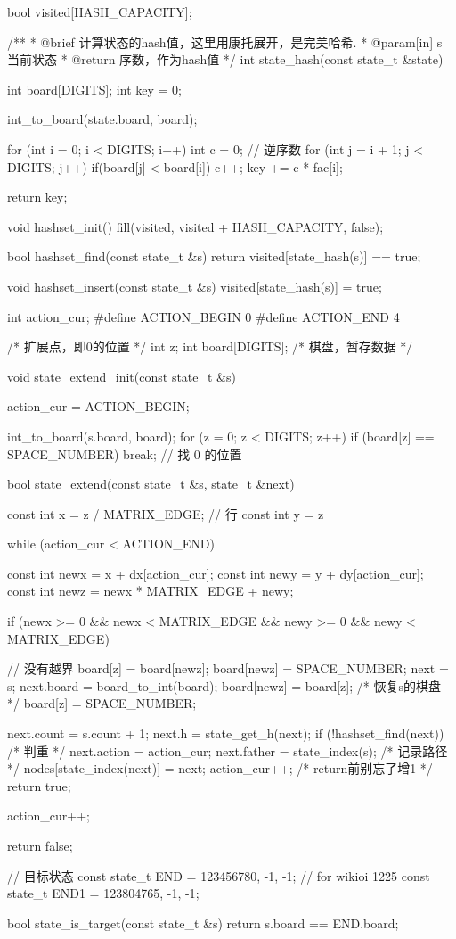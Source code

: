 \begin{Codex}[label=eight_digits_astar.c]
bool visited[HASH_CAPACITY];

/**
 * @brief 计算状态的hash值，这里用康托展开，是完美哈希.
 * @param[in] s 当前状态
 * @return 序数，作为hash值
 */
int state_hash(const state_t &state) {
    int board[DIGITS];
    int key = 0;

    int_to_board(state.board, board);

    for (int i = 0; i < DIGITS; i++) {
        int c = 0; // 逆序数
        for (int j = i + 1; j < DIGITS; j++) {
            if(board[j] < board[i]) {
                c++;
            }
        }
        key += c * fac[i];
    }

    return key;
}

void hashset_init() {
    fill(visited, visited + HASH_CAPACITY, false);
}

bool hashset_find(const state_t &s) {
    return visited[state_hash(s)] == true;
}

void hashset_insert(const state_t &s) {
    visited[state_hash(s)] = true;
}

int action_cur;
#define ACTION_BEGIN 0
#define ACTION_END 4

/* 扩展点，即0的位置 */
int z;
int board[DIGITS];  /* 棋盘，暂存数据 */

void state_extend_init(const state_t &s) {
    action_cur = ACTION_BEGIN;

    int_to_board(s.board, board);
    for (z = 0; z < DIGITS; z++) {
        if (board[z] == SPACE_NUMBER) {
            break;  // 找 0 的位置
        }
    }
}

bool state_extend(const state_t &s, state_t &next) {
    const int x = z / MATRIX_EDGE; // 行
    const int y = z %

    while (action_cur < ACTION_END) {
        const int newx = x + dx[action_cur];
        const int newy = y + dy[action_cur];
        const int newz = newx * MATRIX_EDGE + newy;

        if (newx >= 0 && newx < MATRIX_EDGE && newy >= 0 &&
                newy < MATRIX_EDGE) { // 没有越界
            board[z] = board[newz];
            board[newz] = SPACE_NUMBER;
            next = s;
            next.board = board_to_int(board);
            board[newz] = board[z]; /* 恢复s的棋盘 */
            board[z] = SPACE_NUMBER;

            next.count = s.count + 1;
            next.h = state_get_h(next);
            if (!hashset_find(next)) { /* 判重 */
                next.action = action_cur;
                next.father = state_index(s);
                /* 记录路径 */
                nodes[state_index(next)] = next;
                action_cur++; /* return前别忘了增1 */
                return true;
            }
        }
        action_cur++;
    }
    return false;
}

// 目标状态
const state_t END = {123456780, -1, -1};
// for wikioi 1225
const state_t END1 = {123804765, -1, -1};

bool state_is_target(const state_t &s) {
    return s.board == END.board;
}
\end{Codex}


